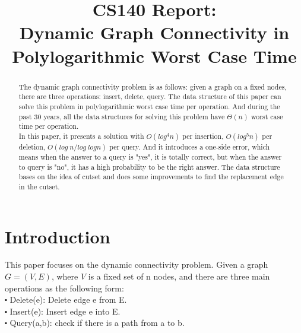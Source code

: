 \documentclass[conference,compsoc]{IEEEtran}
\begin{document}
\title{
	CS140 Report: \\Dynamic Graph Connectivity in Polylogarithmic Worst Case Time
}


\author{
}

\maketitle


\begin{abstract}
The dynamic graph connectivity problem is as follows: given a graph on a fixed nodes, there are three operations: insert, delete, query. The data structure of this paper can solve this problem in polylogarithmic worst case time per operation. And during the past 30 years, all the data structures for solving this problem have $\Theta(n)$ worst case time per operation. 
\\
In this paper, it presents a solution with $O(log^4n)$ per insertion, $O(log^5n)$ per deletion, $O(log\ n/log\ log n)$ per query. And it introduces a one-side error, which means when the answer to a query is "yes", it is totally correct, but when the answer to query is "no", it has a high probability to be the right answer. The data structure bases on the idea of cutset and does some improvements to find the replacement edge in the cutset. 
\end{abstract}
\section{Introduction}
This paper focuses on the dynamic connectivity problem. Given a graph $G=(V,E)$, where $V$ is a fixed set of n nodes, and there are three main operations as the following form:\\

$\centerdot$ Delete(e): Delete edge e from E.\\

$\centerdot$ Insert(e): Insert edge e into E.\\

$\centerdot$ Query(a,b): check if there is a path from a to b.\\
\end{document}
